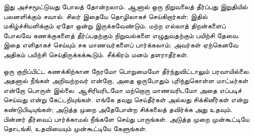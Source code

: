 \documentclass[../../../include/open-logic-section]{subfiles}
\begin{document}
இது அச்சமூட்டுவது போலத் தோன்றலாம். ஆனால் ஒரு
நிறுவலைத் தீர்ப்பது இறுதியில் பலனளிக்கும் சவால்.
சிலர் இதையே தொழிலாகச் செய்கிறார்கள்; இதில்
மகிழ்ச்சியளிக்கும் ஏதோ ஒன்று இருக்கவேண்டும்.
மற்ற எல்லாத் திறன்களைப் போலவே கணக்குகளைத்
தீர்ப்பதற்கும் நிறுவல்களை எழுதுவதற்கும் பயிற்சி
தேவை. இதை எளிதாகச் செய்யும் சக மாணவர்களைப்
பார்க்கலாம்; அவர்கள் ஏற்கெனவே அதிகம் பயிற்சி
செய்திருக்கக்கூடும். சீக்கிரம் மனம் தளராதீர்கள்.

ஒரு குறிப்பிட்ட கணக்கிற்கான நேரமோ பொறுமையோ
தீர்ந்துவிட்டாலும் பரவாயில்லை. அதனால் நீங்கள்
அறிவற்றவர் என்றோ, அதை ஒருபோதும் புரிந்துகொள்ள
மாட்டீர்கள் என்றோ பொருள் இல்லை. ஆசிரியரிடமோ
மற்றொரு மாணவரிடமோ அதை எப்படிச் செய்வது என்று
கேட்டறியுங்கள். எங்கே தவறு செய்தீர்கள் அல்லது
சிக்கினீர்கள் என்று கண்டுபிடியுங்கள்; அடுத்த முறை
அதேபோன்ற சிக்கலைத் தவிர்க்க அது உதவும். பின்னர்
தீர்வைப் பார்க்காமல் நீங்களே செய்து பாருங்கள்.
அடுத்த முறை முன்கூட்டியே தொடங்கி, உதவியையும்
முன்கூட்டியே கேளுங்கள்.
\end{document}
